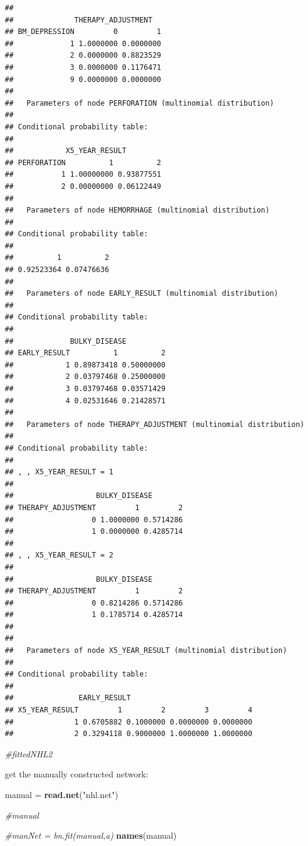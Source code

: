 \documentclass[]{article}
\newenvironment{Shaded}{\begin{snugshade}}{\end{snugshade}}
\newcommand{\KeywordTok}[1]{\textcolor[rgb]{0.13,0.29,0.53}{\textbf{{#1}}}}
\newcommand{\StringTok}[1]{\textcolor[rgb]{0.31,0.60,0.02}{{#1}}}
\newcommand{\CommentTok}[1]{\textcolor[rgb]{0.56,0.35,0.01}{\textit{{#1}}}}
\newcommand{\NormalTok}[1]{{#1}}
\begin{document}
\begin{verbatim}
##  
##              THERAPY_ADJUSTMENT
## BM_DEPRESSION         0         1
##             1 1.0000000 0.0000000
##             2 0.0000000 0.8823529
##             3 0.0000000 0.1176471
##             9 0.0000000 0.0000000
## 
##   Parameters of node PERFORATION (multinomial distribution)
## 
## Conditional probability table:
##  
##            X5_YEAR_RESULT
## PERFORATION          1          2
##           1 1.00000000 0.93877551
##           2 0.00000000 0.06122449
## 
##   Parameters of node HEMORRHAGE (multinomial distribution)
## 
## Conditional probability table:
##  
##          1          2 
## 0.92523364 0.07476636 
## 
##   Parameters of node EARLY_RESULT (multinomial distribution)
## 
## Conditional probability table:
##  
##             BULKY_DISEASE
## EARLY_RESULT          1          2
##            1 0.89873418 0.50000000
##            2 0.03797468 0.25000000
##            3 0.03797468 0.03571429
##            4 0.02531646 0.21428571
## 
##   Parameters of node THERAPY_ADJUSTMENT (multinomial distribution)
## 
## Conditional probability table:
##  
## , , X5_YEAR_RESULT = 1
## 
##                   BULKY_DISEASE
## THERAPY_ADJUSTMENT         1         2
##                  0 1.0000000 0.5714286
##                  1 0.0000000 0.4285714
## 
## , , X5_YEAR_RESULT = 2
## 
##                   BULKY_DISEASE
## THERAPY_ADJUSTMENT         1         2
##                  0 0.8214286 0.5714286
##                  1 0.1785714 0.4285714
## 
## 
##   Parameters of node X5_YEAR_RESULT (multinomial distribution)
## 
## Conditional probability table:
##  
##               EARLY_RESULT
## X5_YEAR_RESULT         1         2         3         4
##              1 0.6705882 0.1000000 0.0000000 0.0000000
##              2 0.3294118 0.9000000 1.0000000 1.0000000
\end{verbatim}

\begin{Shaded}
\begin{Highlighting}[]
\CommentTok{#fittedNHL2}
\end{Highlighting}
\end{Shaded}

get the manually constructed network:

\begin{Shaded}
\begin{Highlighting}[]
\NormalTok{manual =}\StringTok{ }\KeywordTok{read.net}\NormalTok{(}\StringTok{"nhl.net"}\NormalTok{)}

\CommentTok{#manual}

\CommentTok{#manNet = bn.fit(manual,a)}
\KeywordTok{names}\NormalTok{(manual)}
\end{Highlighting}
\end{Shaded}
\end{document}
